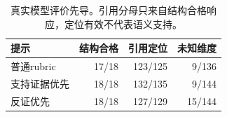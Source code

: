 \begin{table}[t]
\caption{真实模型评价先导。引用分母只来自结构合格响应，定位有效不代表语义支持。}\label{tab:judge}
\centering\small
\begin{tabularx}{\columnwidth}{Xrrr}
\toprule
提示 & 结构合格 & 引用定位 & 未知维度 \\
\midrule
普通rubric & 17/18 & 123/125 & 9/136 \\
支持证据优先 & 18/18 & 132/135 & 9/144 \\
反证优先 & 18/18 & 127/129 & 15/144 \\
\bottomrule
\end{tabularx}
\end{table}
